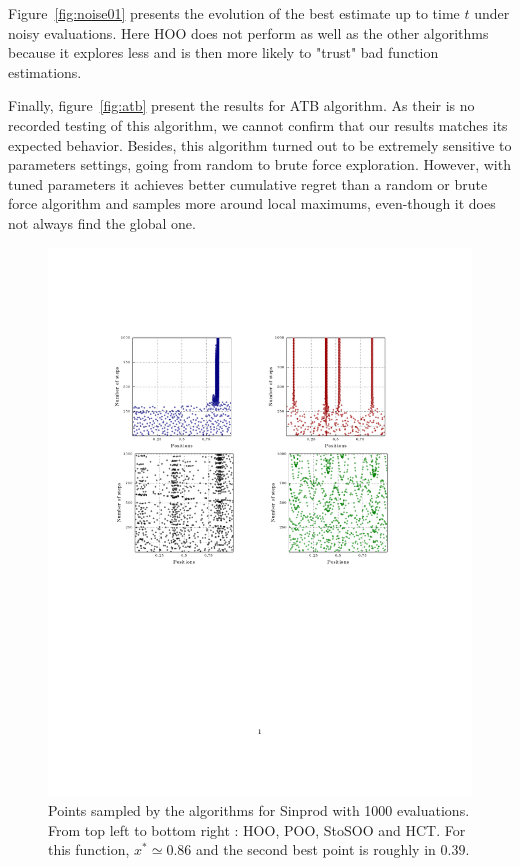 \documentclass[a4paper,10pt]{article}
\begin{document}
Figure~\ref{fig:noise01} presents the evolution of the best estimate up to time $t$ under noisy evaluations. Here HOO does not perform as well as the other algorithms because it explores less and is then more likely to "trust" bad function estimations.

Finally, figure~\ref{fig:atb} present the results for ATB algorithm. As their is no recorded testing of this algorithm, we cannot confirm that our results matches its expected behavior. Besides, this algorithm turned out to be extremely sensitive to parameters settings, going from random to brute force exploration. However, with tuned parameters it achieves better cumulative regret than a random or brute force algorithm and samples more around local maximums, even-though it does not always find the global one.


\begin{figure}
\hspace{-4.5cm}\includegraphics[trim = {0 6cm 0 4cm},clip]{marginal1000.pdf}
\vspace{-6cm}
  \caption{\label{fig:position1000}Points sampled by the algorithms for Sinprod with 1000 evaluations. From top left to bottom right : HOO, POO, StoSOO and HCT. For this function, $x^*\simeq 0.86$ and the second best point is roughly in $0.39$.}
\end{figure}
\end{document}
